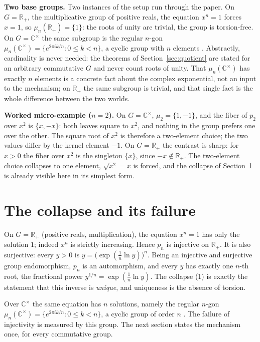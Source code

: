 \documentclass[submission,noinfoline]{jsfds}
\begin{document}
\textbf{Two base groups.} Two instances of the setup run through the
paper. On $G=\mathbb R_+$, the multiplicative group of positive reals,
the equation $x^n=1$ forces $x=1$, so $\mu_n(\mathbb R_+)=\{1\}$: the
roots of unity are trivial, the group is torsion-free. On
$G=\mathbb C^\times$ the same subgroup is the regular $n$-gon
$\mu_n(\mathbb C^\times)=\{e^{2\pi i k/n}:0\le k<n\}$, a cyclic group
with $n$ elements \citep{Gauss1801}. Abstractly, cardinality is never
needed: the theorems of Section~\ref{sec:quotient} are stated for an
arbitrary commutative $G$ and never count roots of unity. That
$\mu_n(\mathbb C^\times)$ has exactly $n$ elements is a concrete fact
about the complex exponential, not an input to the mechanism; on
$\mathbb R_+$ the same subgroup is trivial, and that single fact is the
whole difference between the two worlds.

\textbf{Worked micro-example ($n=2$).} On $G=\mathbb C^\times$,
$\mu_2=\{1,-1\}$, and the fiber of $p_2$ over $x^2$ is $\{x,-x\}$:
both leaves square to $x^2$, and nothing in the group prefers one over
the other. The square root of $x^2$ is therefore a two-element choice;
the two values differ by the kernel element $-1$. On $G=\mathbb R_+$
the contrast is sharp: for $x>0$ the fiber over $x^2$ is the singleton
$\{x\}$, since $-x\notin\mathbb R_+$. The two-element choice collapses
to one element, $\sqrt{x^2}=x$ is forced, and the collapse of
Section~\ref{sec:collapse} is already visible here in its simplest
form.

\section{The collapse and its failure}\label{sec:collapse}

On $G=\mathbb R_+$ (positive reals, multiplication), the equation
$x^n=1$ has only the solution $1$; indeed $x^n$ is strictly increasing.
Hence $p_n$ is injective on $\mathbb R_+$. It is also surjective: every
$y>0$ is $y=\bigl(\exp(\tfrac1n\ln y)\bigr)^n$. Being an injective and
surjective group endomorphism, $p_n$ is an automorphism, and every $y$
has exactly one $n$-th root, the fractional power
$y^{1/n}=\exp(\tfrac1n\ln y)$. The collapse (1) is exactly the
statement that this inverse is \emph{unique}, and uniqueness is the
absence of torsion.

Over $\mathbb C^\times$ the same equation has $n$ solutions, namely the
regular $n$-gon $\mu_n(\mathbb C^\times)=\{e^{2\pi i k/n}:0\le k<n\}$, a
cyclic group of order $n$ \citep{Gauss1801}.
The failure of injectivity is measured by this
group. The next section states the mechanism once, for every commutative
group.
\end{document}

